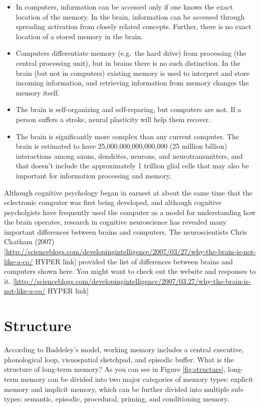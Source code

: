 \documentclass[
]{krantz}
\providecommand{\tightlist}{%
  \setlength{\itemsep}{0pt}\setlength{\parskip}{0pt}}
\begin{document}
\begin{itemize}
\tightlist
\item
  In computers, information can be accessed only if one knows the exact location of the
  memory. In the brain, information can be accessed through spreading activation from closely related concepts. Further, there is no exact location of a stored memory in the brain.
\item
  Computers differentiate memory (e.g.~the hard drive) from processing
  (the central processing unit), but in brains there is no such distinction.
  In the brain (but not in computers) existing memory is used to interpret and
  store incoming information, and retrieving information from memory changes
  the memory itself.
\item
  The brain is self-organizing and self-reparing, but computers are not. If a person
  suffers a stroke, neural plasticity will help them recover.
\item
  The brain is significantly more complex than any current computer. The brain is estimated
  to have 25,000,000,000,000,000 (25 million billion) interactions among axons,
  dendrites, neurons, and neurotransmitters, and that doesn't include the approximately
  1 trillion glial cells that may also be important for information processing and memory.
\end{itemize}

Although cognitive psychology began in earnest at about the same time that the
eclectronic computer was first being developed, and although cognitive psycholgists
have frequently used the computer as a model for understanding how the brain
operates, research in cognitive neuroscience has revealed many important differences
between brains and computers. The neuroscientists Chris Chatham (2007)
{[}\url{http://scienceblogs.com/developingintelligence/2007/03/27/why-the-brain-is-not-like-a-co/} HYPER link{]} provided
the list of differences between brains and computers shown here. You might want
to check out the website and responses to it.
{[}\url{http://scienceblogs.com/developingintelligence/2007/03.27/why-the-brain-is-not-like-a-co/} HYPER link{]}

\hypertarget{structure}{%
\section{Structure}\label{structure}}

According to Baddeley's model, working memory includes a central executive, phonological loop, visuospatial sketchpad, and episodic buffer. What is the structure of long-term memory? As you can see in Figure \ref{fig:structure}, long-term memory can be divided into two major categories of memory types: explicit memory and implicit memory, which can be further divided into multiple sub-types: semantic, episodic, procedural, priming, and conditioning memory.
\end{document}
